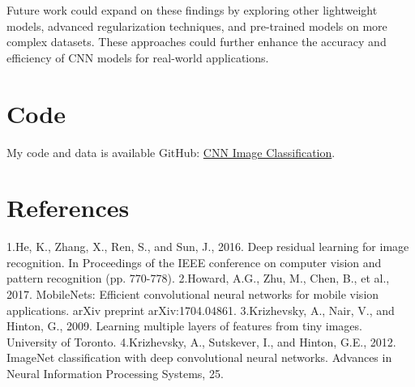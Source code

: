 \documentclass[10pt,twocolumn,letterpaper]{article}
\begin{document}
Future work could expand on these findings by exploring other lightweight models, advanced regularization techniques, and pre-trained models on more complex datasets. These approaches could further enhance the accuracy and efficiency of CNN models for real-world applications.
\section{Code}
My code and data is available GitHub: \href{ https://github.com/shivangi-crypto/CNN_Image_classification.git}{CNN Image Classification}.
\section{References}
1.He, K., Zhang, X., Ren, S., and Sun, J., 2016.  Deep residual learning for image recognition. In Proceedings of the IEEE conference on computer vision and pattern recognition (pp. 770-778).
2.Howard, A.G., Zhu, M., Chen, B., et al., 2017. MobileNets: Efficient convolutional neural networks for mobile vision applications. arXiv preprint arXiv:1704.04861.
3.Krizhevsky, A., Nair, V., and Hinton, G., 2009. Learning multiple layers of features from tiny images. University of Toronto.
4.Krizhevsky, A., Sutskever, I., and Hinton, G.E., 2012. ImageNet classification with deep convolutional neural networks. Advances in Neural Information Processing Systems, 25.
\end{document}
